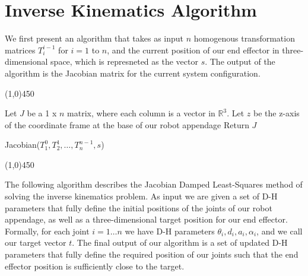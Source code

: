 \section{Inverse Kinematics Algorithm}
We first present an algorithm that takes as input $n$ homogenous transformation matrices $T^{i-1}_i$ for $i=1$ to $n$, and
the current position of our end effector in three-dimensional space, which is represneted as the vector $s$. 
The output of the algorithm is the Jacobian matrix for the current system configuration.\\
			\newpage

\begin{center}
\line(1,0){450}
\end{center}
\begin{algorithm}[H]
\DontPrintSemicolon
Let $J$ be a 1 x $n$ matrix, where each column is a vector in $\mathbb{R}^3$.
Let $z$ be the z-axis of the coordinate frame at the base of our robot appendage\;
Return $J$
\caption{Jacobian($T^0_1, T^1_2, \ldots, T^{n-1}_n, s$)\label{IR}}
\begin{center}
\noindent\line(1,0){450}
\end{center}
\end{algorithm}
\vspace{2cm}

The following algorithm describes the Jacobian Damped Least-Squares method of solving the inverse kinematics problem. 
As input we are given a set of D-H parameters that fully define
the initial positions of the joints of our robot appendage, as well as a three-dimensional target position for our end effector. 
Formally, for each joint $i = 1 \ldots n$ we have D-H parameters $\theta_i, d_i, a_i, \alpha_i$, and
we call our target vector $t$. The final output of our algorithm is a set of updated D-H parameters that fully define
the required position of our joints such that the end effector position is sufficiently close to the target.
\newpage


